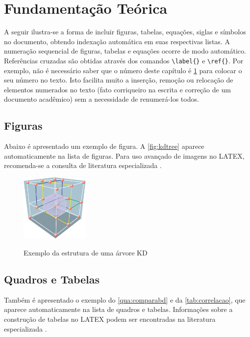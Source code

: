 %
%

\chapter{Fundamentação Teórica}
\label{chap:fundamentacaoTeorica}

A seguir ilustra-se a forma de incluir figuras, tabelas, equações, siglas e símbolos no documento, obtendo indexação automática em suas respectivas listas.
A numeração sequencial de figuras, tabelas e equações ocorre de modo automático.
Referências cruzadas são obtidas através dos comandos \verb#\label{}# e \verb#\ref{}#.
Por exemplo, não é necessário saber que o número deste capítulo é \ref{chap:fundamentacaoTeorica} para colocar o seu número no texto.
Isto facilita muito a inserção, remoção ou relocação de elementos numerados no texto (fato corriqueiro na escrita e correção de um documento acadêmico) sem a necessidade de renumerá-los todos.

\section{Figuras}
\label{sec:figuras}

Abaixo é apresentado um exemplo de figura.
A \autoref{fig:kdtree} aparece automaticamente na lista de figuras.
Para uso avançado de imagens no LATEX, recomenda-se a consulta de literatura especializada \cite{Goossens2007}.

\begin{figure}[!htb]
    \centering
    \caption{Exemplo da estrutura de uma árvore KD}
    \includegraphics[width=0.3\textwidth]{./04-figuras/figkdtree}
    \label{fig:kdtree}
\end{figure}

\section{Quadros e Tabelas}
\label{sec:tabelas}

Também é apresentado o exemplo do \autoref{qua:comparabd} e da \autoref{tab:correlacao}, que aparece automaticamente na lista de quadros e tabelas.
Informações sobre a construção de tabelas no LATEX podem ser encontradas na literatura especializada \cite{Lamport1986,Buerger1989,Kopka2003,Mittelbach2004}.

